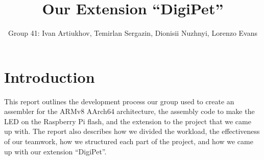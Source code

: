 \documentclass[11pt, oneside, UKenglish]{article}
\begin{document}
\title{\vspace{-2cm}Our Extension \enquote{DigiPet}}
\author{Group 41: Ivan Artiukhov, Temirlan Sergazin, Dionisii Nuzhnyi, Lorenzo Evans}
\date{}

\maketitle

\section{Introduction}
This report outlines the development process our group used to create an assembler for the ARMv8 AArch64 architecture, the assembly code to make the LED on the Raspberry Pi flash, and the extension to the project that we came up with. 
The report also describes how we divided the workload, the effectiveness of our teamwork, how we structured each part of the project, and how we came up with our extension \enquote{DigiPet}.
\end{document}
